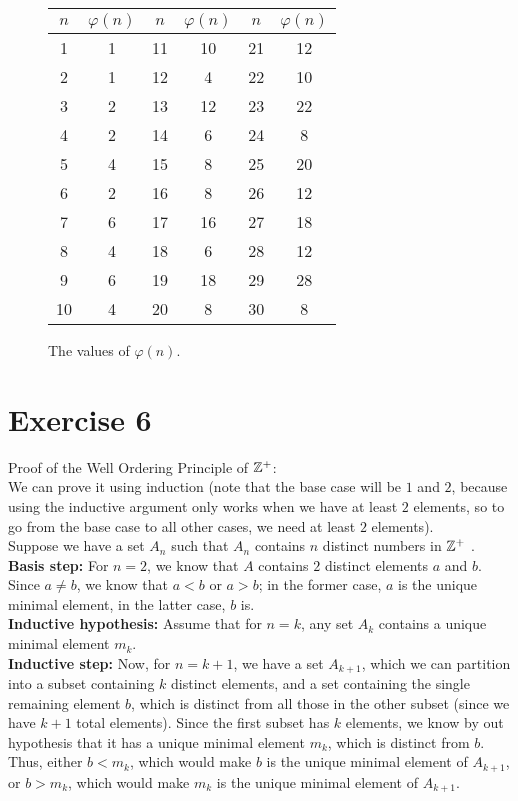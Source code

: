 \documentclass[12pt]{article}
\begin{document}
    \begin{figure}[H]
        \centering

        \begin{tabular}{|*{6}{c|}}
            \hline
            \( n \) & \( \varphi(n) \) & \( n \) & \( \varphi(n) \) 
            & \( n \) & \( \varphi(n) \) \\
            \hline
            1 & 1 & 11 & 10 & 21 & 12 \\
            2 & 1 & 12 & 4 & 22 & 10 \\
            3 & 2 & 13 & 12 & 23 & 22 \\
            4 & 2 & 14 & 6 & 24 & 8 \\
            5 & 4 & 15 & 8 & 25 & 20 \\
            6 & 2 & 16 & 8 & 26 & 12 \\
            7 & 6 & 17 & 16 & 27 & 18 \\
            8 & 4 & 18 & 6 & 28 & 12 \\
            9 & 6 & 19 & 18 & 29 & 28 \\
            10 & 4 & 20 & 8 & 30 & 8 \\
            \hline
        \end{tabular}
        \caption{\label{fig:figure1} The values of $\varphi(n)$.}
    \end{figure}
    
    \section*{Exercise 6}
    Proof of the Well Ordering Principle of $\mathbb{Z}^+$: \\
    We can prove it using induction
    (note that the base case will be $1$ and $2$,
    because using the inductive argument only works
    when we have at least $2$ elements,
    so to go from the base case to all other cases,
    we need at least $2$ elements). \\
    Suppose we have a set $A_n$
    such that $A_n$ contains $n$ distinct numbers in $\mathbb{Z}^+$ . \\
    \textbf{Basis step:}
    For $n = 2$,
    we know that $A$ contains $2$ distinct elements $a$ and $b$.
    Since $a \neq b$,
    we know that $a < b$ or $a > b$;
    in the former case, $a$ is the unique minimal element,
    in the latter case, $b$ is. \\
    \textbf{Inductive hypothesis:}
    Assume that for $n = k$,
    any set $A_k$ contains a unique minimal element $m_k$. \\
    \textbf{Inductive step:} 
    Now, for $n = k+1$,
    we have a set $A_{k+1}$,
    which we can partition into a subset containing
    $k$ distinct elements,
    and a set containing the single remaining element $b$,
    which is distinct from all those in the other subset
    (since we have $k+1$ total elements).
    Since the first subset has $k$ elements,
    we know by out hypothesis that it has
    a unique minimal element $m_k$,
    which is distinct from $b$.
    Thus, either $b < m_k$,
    which would make $b$ is the unique minimal element of $A_{k+1}$,
    or $b > m_k$,
    which would make $m_k$ is the unique minimal element of $A_{k+1}$. \\
\end{document}

